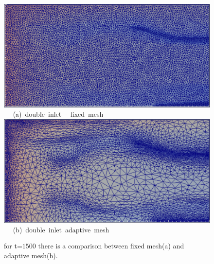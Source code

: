 \begin{landscape}
\begin{figure}[ht] 
\vbox{
\hbox{\hspace{3.5cm}
\includegraphics[width=.8\textwidth]{./Pics1/5reg_dinlet_fixed_end.pdf} 
}
\vspace{0.0cm}
\hbox{\hspace{6.5cm} (a) double inlet - fixed mesh   
}
\hbox{\hspace{3.5cm}
\includegraphics[width=.8\textwidth]{./Pics1/5reg_dinlet_adapt_end.pdf}
}
\vspace{0.0cm}
\hbox{\hspace{6.5cm} (b) double inlet adaptive mesh   
}
}     
\caption{for t=$1500$ there is a comparison between fixed mesh(a) and adaptive mesh(b).}
\label{fig:3testcase_d}
\end{figure}
\end{landscape}
\clearpage

